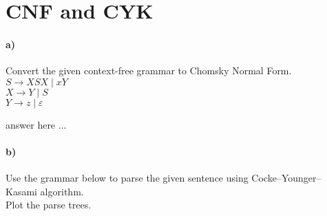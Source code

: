\documentclass[a4paper,12pt]{article}
\begin{document}
\newpage
\section{CNF and CYK \hfill {}}

\paragraph{a)} Convert the given context-free grammar to Chomsky Normal Form. \\

$ S   \to XSX \mid xY $ \\
$ X   \to Y \mid S $ \\
$ Y   \to z \mid \varepsilon $ \\

\begin{tcolorbox}
answer here ...
\vspace{18cm} %
\end{tcolorbox}


\paragraph{b)} Use the grammar below to parse the given sentence using Cocke–Younger–Kasami algorithm. \\
Plot the parse trees. \\
\end{document}
